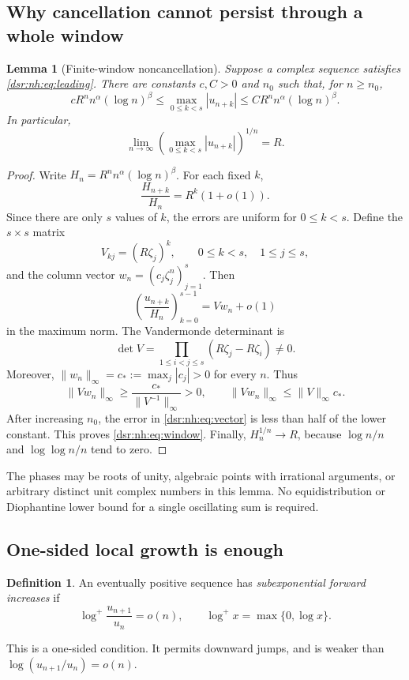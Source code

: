 \documentclass[11pt,a4paper]{article}
\numberwithin{equation}{section}
\newtheorem{lemma}[theorem]{Lemma}
\theoremstyle{definition}
\newtheorem{definition}[theorem]{Definition}
\theoremstyle{remark}
\newcommand{\logp}{\log^{+}}
\theoremstyle{definition}
\theoremstyle{plain}
\begin{document}
\subsection{Why cancellation cannot persist through a whole window}
\begin{lemma}[Finite-window noncancellation]
\label{dsr:nh:lem:window}
Suppose a complex sequence satisfies \eqref{dsr:nh:eq:leading}. There are constants
$c,C>0$ and $n_0$ such that, for $n\ge n_0$,
\begin{equation}
cR^n n^\alpha(\log n)^\beta
\le \max_{0\le k<s}|u_{n+k}|
\le CR^n n^\alpha(\log n)^\beta.
\label{dsr:nh:eq:window}
\end{equation}
In particular,
\begin{equation}
\lim_{n\to\infty}
\left(\max_{0\le k<s}|u_{n+k}|\right)^{1/n}=R.
\label{dsr:nh:eq:windowroot}
\end{equation}
\end{lemma}
\begin{proof}
Write $H_n=R^n n^\alpha(\log n)^\beta$. For each fixed $k$,
\[
\frac{H_{n+k}}{H_n}=R^k(1+o(1)).
\]
Since there are only $s$ values of $k$, the errors are uniform for
$0\le k<s$. Define the $s\times s$ matrix
\[
V_{kj}=(R\zeta_j)^k,
\qquad 0\le k<s,\quad1\le j\le s,
\]
and the column vector $w_n=(c_j\zeta_j^n)_{j=1}^{s}$. Then
\begin{equation}
\left(\frac{u_{n+k}}{H_n}\right)_{k=0}^{s-1}=Vw_n+o(1)
\label{dsr:nh:eq:vector}
\end{equation}
in the maximum norm. The Vandermonde determinant is
\[
\det V=\prod_{1\le i<j\le s}(R\zeta_j-R\zeta_i)\ne0.
\]
Moreover, $\|w_n\|_\infty=c_*:=\max_j|c_j|>0$ for every $n$. Thus
\[
\|Vw_n\|_\infty\ge\frac{c_*}{\|V^{-1}\|_\infty}>0,
\qquad
\|Vw_n\|_\infty\le\|V\|_\infty c_*.
\]
After increasing $n_0$, the error in \eqref{dsr:nh:eq:vector} is less than half
of the lower constant. This proves \eqref{dsr:nh:eq:window}. Finally,
$H_n^{1/n}\to R$, because $\log n/n$ and $\log\log n/n$ tend to zero.
\end{proof}
The phases may be roots of unity, algebraic points with irrational
arguments, or arbitrary distinct unit complex numbers in this lemma.
No equidistribution or Diophantine lower bound for a single oscillating
sum is required.

\subsection{One-sided local growth is enough}
\begin{definition}
An eventually positive sequence has \emph{subexponential forward
increases} if
\begin{equation}
\logp\frac{u_{n+1}}{u_n}=o(n),
\qquad \logp x=\max\{0,\log x\}.
\label{dsr:nh:eq:local}
\end{equation}
\end{definition}
This is a one-sided condition. It permits downward jumps, and is weaker
than $\log(u_{n+1}/u_n)=o(n)$.
\end{document}
